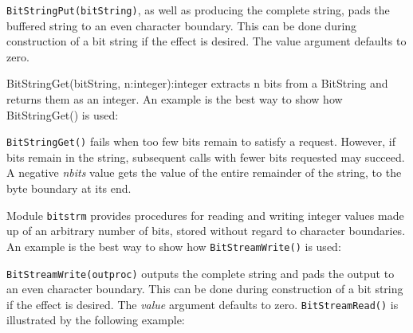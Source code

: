 \texttt{BitStringPut(bitString)}, as well as producing the complete
string, pads the buffered string to an even character boundary. This
can be done during construction of a bit string if the effect is
desired. The {\textquotedbl}value{\textquotedbl} argument defaults to
zero.

\textsf{BitStringGet(bitString, n:integer):integer} extracts n bits from
a BitString and returns them as an integer. An example is the best way
to show how \textsf{BitStringGet()} is used:


\texttt{BitStringGet()} fails when too few bits remain to satisfy a
request. However, if bits remain in the string, subsequent calls with
fewer bits requested may succeed. A negative \textit{nbits} value gets
the value of the entire remainder of the string, to the byte boundary
at its end.

Module \texttt{bitstrm} provides procedures for reading and writing
integer values made up of an arbitrary number of bits, stored without
regard to character boundaries. An example is the best way to show how
\texttt{BitStreamWrite()} is used:


\texttt{BitStreamWrite(outproc)} outputs the complete string and pads
the output to an even character boundary. This can be done during
construction of a bit string if the effect is desired. The
\textit{value} argument defaults to zero. \texttt{BitStreamRead()} is
illustrated by the following example:


